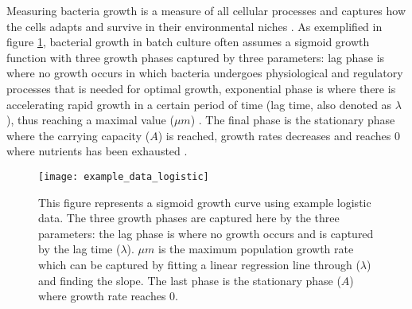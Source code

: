 \documentclass[11pt]{article}
\begin{document}
Measuring bacteria growth is a measure of all cellular processes and captures how the cells adapts and 
survive in their environmental niches \cite{tonner_bayesian_2020}. As exemplified in figure \ref{fig:mesh1}, bacterial growth in batch culture often assumes a sigmoid growth 
function with three growth phases captured by three parameters: lag phase is where no growth occurs in which 
bacteria undergoes physiological and regulatory processes that is needed for optimal growth, exponential
phase is where there is accelerating rapid growth in a certain period of time (lag time, also denoted as $\lambda$),
thus reaching a maximal value ($\mu m$) \cite{rolfe_lag_2012}. The final phase is the stationary phase where the carrying capacity ($A$) is reached, 
growth rates decreases and reaches 0 where nutrients has been exhausted \cite{tonner_detecting_2017,zwietering_modeling_1990}.  

    \begin{figure}[H]
    \centering
    \texttt{[image: example\_data\_logistic]}
    \caption{This figure represents a sigmoid growth curve using example logistic data. The three growth phases are captured here by the three parameters: the lag phase is where no growth occurs and is captured by the lag time ($\lambda$).
    $\mu m$ is the maximum population growth rate which can be captured by fitting a linear regression line through ($\lambda$) and finding the slope. The last phase is the stationary phase ($A$) where growth rate reaches 0.}
    \label{fig:mesh1}
    \end{figure}
\end{document}
